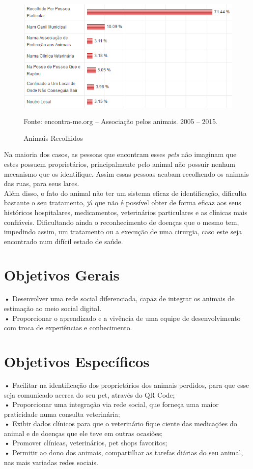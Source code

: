 \begin{figure}[!htb]
	\centering
	\includegraphics[scale=0.70
	]{imagens/animais}
	\caption{Animais Recolhidos}
	Fonte: encontra-me.org – Associação pelos animais. 2005 – 2015.
	\label{Rotulo}
\end{figure}
\newpage
Na maioria dos casos, as pessoas que encontram esses {\it pets} não imaginam que estes possuem proprietários, principalmente pelo animal não possuir nenhum mecanismo que os identifique. Assim essas pessoas acabam recolhendo os animais das ruas, para seus lares. 
\\
\indent
Além disso, o fato do animal não ter um sistema eficaz de identificação, dificulta bastante o seu tratamento, já que não é possível obter de forma eficaz aos seus históricos hospitalares, medicamentos, veterinários particulares e as clínicas mais confiáveis. Dificultando ainda o reconhecimento de doenças que o mesmo tem, impedindo assim, um tratamento ou a execução de uma cirurgia, caso este seja encontrado num difícil estado de saúde.  


\section{Objetivos Gerais}
\textbf{•} Desenvolver uma rede social diferenciada, capaz de integrar os animais de estimação ao meio social digital.
\\
\indent
\textbf{•} Proporcionar o aprendizado e a vivência de uma equipe de desenvolvimento com troca de experiências e conhecimento.

\section{Objetivos Específicos}
\textbf{•} Facilitar na identificação dos proprietários dos animais perdidos, para que esse seja comunicado acerca do seu pet, através do QR Code;
\\
\indent
\textbf{•} Proporcionar uma integração via rede social, que forneça uma maior praticidade numa consulta veterinária;
\\
\indent
\textbf{•} Exibir dados clínicos para que o veterinário fique ciente das medicações do animal e de doenças que ele teve em outras ocasiões;
\\
\indent
\textbf{•} Promover clínicas, veterinários, pet shops favoritos;
\\
\indent
\textbf{•} Permitir ao dono dos animais, compartilhar as tarefas diárias do seu animal, nas mais variadas redes sociais.

